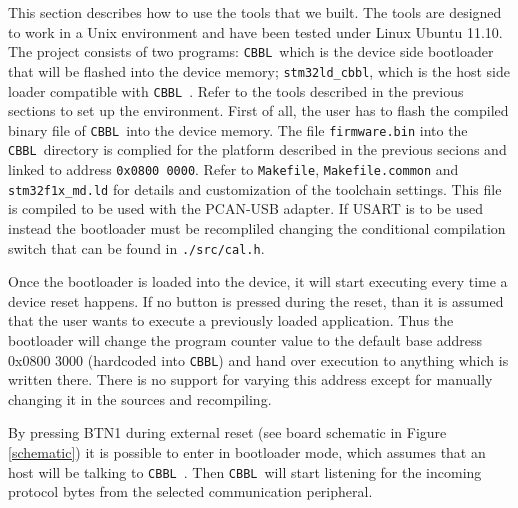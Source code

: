 \documentclass[11pt]{article} %
\newcommand{\cbbl}{\texttt{CBBL}}
\begin{document}
This section describes how to use the tools that we built. The tools are designed to work in a Unix environment and have been tested under Linux Ubuntu 11.10.
The project consists of two programs: \cbbl\, which is the device side bootloader that will be flashed into the device memory; \texttt{stm32ld\_cbbl}, which is the host side loader compatible with \cbbl\ . Refer to the tools described in the previous sections to set up the environment.
First of all, the user has to flash the compiled binary file of \cbbl\ into the device memory. The file \texttt{firmware.bin} into the \cbbl\ directory is complied for the platform described in the previous secions and linked to address \texttt{0x0800 0000}. Refer to \texttt{Makefile}, \texttt{Makefile.common} and \texttt{stm32f1x\_md.ld} for details and customization of the toolchain settings. This file is compiled to be used with the PCAN-USB adapter. If USART is to be used instead the bootloader must be recompliled changing the conditional compilation switch that can be found in \texttt{./src/cal.h}.

Once the bootloader is loaded into the device, it will start executing every time a device reset happens. If no button is pressed during the reset, than it is assumed that the user wants to execute a previously loaded application. Thus the bootloader will change the program counter value to the default base address 0x0800 3000 (hardcoded into \cbbl) and hand over execution to anything which is written there. There is no support for varying this address except for manually changing it in the sources and recompiling.

By pressing BTN1 during external reset (see board schematic in Figure \ref{schematic}) it is possible to enter in bootloader mode, which assumes that an host will be talking to \cbbl\ . Then \cbbl\ will start listening for the incoming protocol bytes from the selected communication peripheral.
\end{document}
